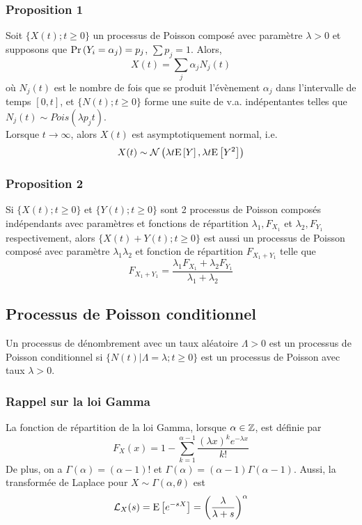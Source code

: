 \documentclass[10pt, french]{article}
\begin{document}
\begin{multicols*}{2}
\subsubsection*{Proposition 1}
Soit $\{ X(t) ; t \geq 0 \}$ un processus de Poisson composé avec paramètre $\lambda > 0$ et supposons que $\Pr \left( Y_i = \alpha_j \right) = p_j$, $\sum p_j = 1$. Alors,
\[X(t) = \sum_j \alpha_j N_j(t) \]
où $N_j(t)$ est le nombre de fois que se produit l'évènement $\alpha_j$ dans l'intervalle de temps $[0,t]$, et $\{N(t) ; t \geq 0  \}$ forme une suite de v.a. indépentantes telles que $N_j(t) \sim Pois(\lambda p_j t)$. \\
Lorsque $t \to \infty$, alors $X(t)$ est asymptotiquement normal, i.e.
\[X(t) \sim \mathcal{N}\left( \lambda t \mathrm{E} \left[ Y \right], \lambda t \mathrm{E} \left[ Y^2 \right] \right)\]

\subsubsection*{Proposition 2}
Si $\{ X(t) ; t \geq 0 \}$ et $\{ Y(t) ; t \geq 0 \}$ sont 2 processus de Poisson composés indépendants avec paramètres et fonctions de répartition $\lambda_1, F_{X_1}$ et $\lambda_2, F_{Y_1}$ respectivement, alors $\{ X(t) + Y(t) ; t \geq 0 \}$ est aussi un processus de Poisson composé avec paramètre $\lambda_1  \lambda_2$ et fonction de répartition $F_{X_1 + Y_1}$ telle que
\[F_{X_1 + Y_1} = \frac{\lambda_1 F_{X_1} + \lambda_2 F_{Y_1}}{\lambda_1 + \lambda_2}  \]

\subsection*{Processus de Poisson conditionnel}
\begin{definition}[Définition]
Un processus de dénombrement avec un taux aléatoire $\Lambda > 0$ est un processus de Poisson conditionnel si $\{ N(t) | \Lambda = \lambda ; t \geq 0 \}$ est un processus de Poisson avec taux $\lambda > 0$.
\end{definition}

\subsubsection*{Rappel sur la loi Gamma}
La fonction de répartition de la loi Gamma, lorsque $\alpha \in \mathbb{Z}$, est définie par
\[F_X(x) = 1 - \sum_{k=1}^{\alpha-1} \frac{(\lambda x)^k e^{-\lambda x}}{k!}\]
De plus, on a $\Gamma(\alpha) = (\alpha-1)!$ et $\Gamma(\alpha) = (\alpha - 1) \Gamma(\alpha - 1)$. Aussi, la transformée de Laplace pour $X \sim \Gamma(\alpha, \theta)$ est
\[\mathcal{L}_X(s) = \mathrm{E} \left[ e^{-s X} \right]  = \left( \frac{\lambda}{\lambda + s} \right)^{\alpha} \]


\end{multicols*}
\end{document}
